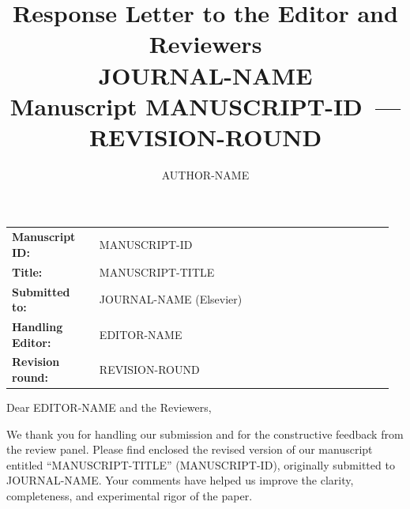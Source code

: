 \documentclass[a4paper,twoside,11pt]{article}
\author[a,*]{{{AUTHOR-NAME}}}
\affil[a]{{{AUTHOR-AFFILIATION}}}
\date{}
\newcommand{\myJournal}{{{JOURNAL-NAME}}}
\newcommand{\myManuscriptID}{{{MANUSCRIPT-ID}}}
\newcommand{\myManuscriptTitle}{{{MANUSCRIPT-TITLE}}}
\newcommand{\myEditorName}{{{EDITOR-NAME}}}
\newcommand{\myRevisionRound}{{{REVISION-ROUND}}}
\begin{document}
\thispagestyle{plain}
\title{\textbf{Response Letter to the Editor and Reviewers} \\
       \large{\myJournal} \\[0.2em]
       \normalsize Manuscript \myManuscriptID\ --- \myRevisionRound}
\maketitle

\vspace{-2em}

\begin{tcolorbox}[
    enhanced, breakable,
    colback=pantonegraytitle!40,
    colframe=pantonegray,
    boxrule=0.5pt, arc=2pt,
    left=10pt, right=10pt, top=4pt, bottom=8pt,
    boxsep=2pt,
    fonttitle=\sffamily\bfseries\small,
    coltitle=black,
    colbacktitle=pantonegraytitle,
    toptitle=3pt, bottomtitle=3pt,
    titlerule=0pt,
    title=Manuscript Information
]
    \begin{tabular}{@{} p{0.22\linewidth} p{0.74\linewidth} @{}}
        \textbf{Manuscript ID:}   & \myManuscriptID \\
        \textbf{Title:}           & \myManuscriptTitle \\
        \textbf{Submitted to:}    & \myJournal{} (Elsevier) \\
        \textbf{Handling Editor:} & \myEditorName \\
        \textbf{Revision round:}  & \myRevisionRound
    \end{tabular}
\end{tcolorbox}

\vspace{1em}

\noindent Dear \myEditorName{} and the Reviewers,

\vspace{0.4em}

We thank you for handling our submission and for the constructive feedback from the review panel. Please find enclosed the revised version of our manuscript entitled \enquote{\myManuscriptTitle} (\myManuscriptID), originally submitted to \myJournal. Your comments have helped us improve the clarity, completeness, and experimental rigor of the paper.
\end{document}
